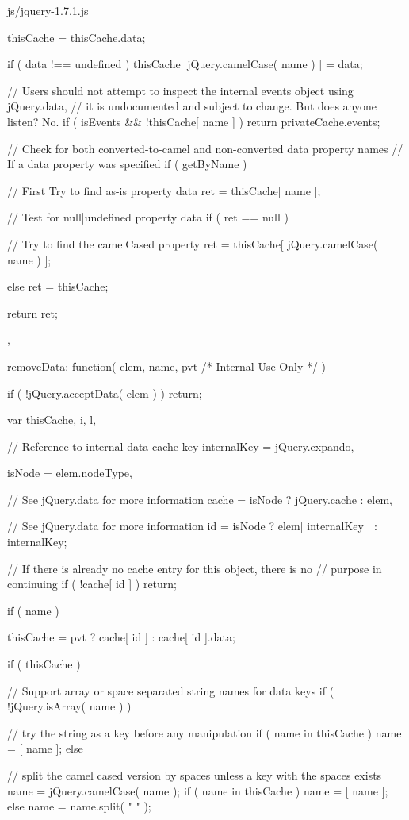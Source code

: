 \documentclass{article}
\begin{document}
\begin{chunk}{js/jquery-1.7.1.js}
{{{{			thisCache = thisCache.data;
		}

		if ( data !== undefined ) {
			thisCache[ jQuery.camelCase( name ) ] = data;
		}

		// Users should not attempt to inspect the internal events object using jQuery.data,
		// it is undocumented and subject to change. But does anyone listen? No.
		if ( isEvents && !thisCache[ name ] ) {
			return privateCache.events;
		}

		// Check for both converted-to-camel and non-converted data property names
		// If a data property was specified
		if ( getByName ) {

			// First Try to find as-is property data
			ret = thisCache[ name ];

			// Test for null|undefined property data
			if ( ret == null ) {

				// Try to find the camelCased property
				ret = thisCache[ jQuery.camelCase( name ) ];
			}
		} else {
			ret = thisCache;
		}

		return ret;
	},

	removeData: function( elem, name, pvt /* Internal Use Only */ ) {
		if ( !jQuery.acceptData( elem ) ) {
			return;
		}

		var thisCache, i, l,

			// Reference to internal data cache key
			internalKey = jQuery.expando,

			isNode = elem.nodeType,

			// See jQuery.data for more information
			cache = isNode ? jQuery.cache : elem,

			// See jQuery.data for more information
			id = isNode ? elem[ internalKey ] : internalKey;

		// If there is already no cache entry for this object, there is no
		// purpose in continuing
		if ( !cache[ id ] ) {
			return;
		}

		if ( name ) {

			thisCache = pvt ? cache[ id ] : cache[ id ].data;

			if ( thisCache ) {

				// Support array or space separated string names for data keys
				if ( !jQuery.isArray( name ) ) {

					// try the string as a key before any manipulation
					if ( name in thisCache ) {
						name = [ name ];
					} else {

						// split the camel cased version by spaces unless a key with the spaces exists
						name = jQuery.camelCase( name );
						if ( name in thisCache ) {
							name = [ name ];
						} else {
							name = name.split( " " );
						}
					}
				}

}}}}}
\end{chunk}
\end{document}
